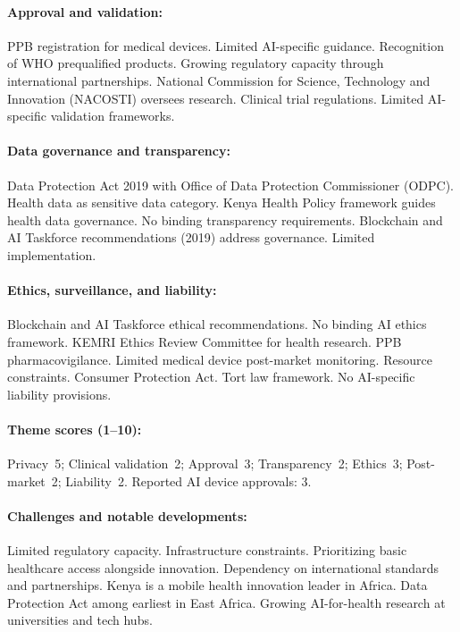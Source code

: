 {\paragraph{Approval and validation:}
PPB registration for medical devices. Limited AI-specific guidance. Recognition of WHO prequalified products. Growing regulatory capacity through international partnerships.
National Commission for Science, Technology and Innovation (NACOSTI) oversees research. Clinical trial regulations. Limited AI-specific validation frameworks.

\paragraph{Data governance and transparency:}
Data Protection Act 2019 with Office of Data Protection Commissioner (ODPC). Health data as sensitive data category. Kenya Health Policy framework guides health data governance.
No binding transparency requirements. Blockchain and AI Taskforce recommendations (2019) address governance. Limited implementation.

\paragraph{Ethics, surveillance, and liability:}
Blockchain and AI Taskforce ethical recommendations. No binding AI ethics framework. KEMRI Ethics Review Committee for health research.
PPB pharmacovigilance. Limited medical device post-market monitoring. Resource constraints.
Consumer Protection Act. Tort law framework. No AI-specific liability provisions.

\paragraph{Theme scores (1--10):}
Privacy~5;
Clinical validation~2;
Approval~3;
Transparency~2;
Ethics~3;
Post-market~2;
Liability~2.
Reported AI device approvals: 3.

\paragraph{Challenges and notable developments:}
Limited regulatory capacity. Infrastructure constraints. Prioritizing basic healthcare access alongside innovation. Dependency on international standards and partnerships.
Kenya is a mobile health innovation leader in Africa. Data Protection Act among earliest in East Africa. Growing AI-for-health research at universities and tech hubs.


}
